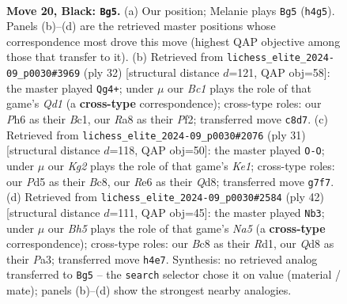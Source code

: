 \documentclass[11pt]{article}
\begin{document}
\clearpage

\begin{figure}[p]\centering
\begin{subfigure}{0.46\textwidth}\centering
\resizebox{\linewidth}{!}{%
\newchessgame
\chessboard[
  setfen={rnbq4/pp4kp/4r2p/1P1p4/3P2Pb/2N1PP2/2QKN3/R4B1R b - - 0 20},
  showmover=false,
  pgfstyle=straightmove, color=movearrow, markmove={h4-g5}
]}
\caption{}
\end{subfigure}\hfill
\begin{subfigure}{0.46\textwidth}\centering
\resizebox{\linewidth}{!}{%
\newchessgame
\chessboard[
  setfen={r3r3/2pknppp/1pn3b1/1R1p4/3P4/P1P4P/2P2PP1/2BQR1K1 w - - 1 17},
  showmover=false,
  pgfstyle=straightmove, color=movearrow, markmove={d1-g4}
]}
\caption{}
\end{subfigure}
\\[4pt]
\begin{subfigure}{0.46\textwidth}\centering
\resizebox{\linewidth}{!}{%
\newchessgame
\chessboard[
  setfen={r1bqk2r/p4pb1/7p/3Pn1p1/2N5/2P3P1/P4PP1/RN1QKB1R b KQkq - 0 16},
  showmover=false,
  pgfstyle=straightmove, color=movearrow, markmove={e8-g8}
]}
\caption{}
\end{subfigure}\hfill
\begin{subfigure}{0.46\textwidth}\centering
\resizebox{\linewidth}{!}{%
\newchessgame
\chessboard[
  setfen={4kb1r/2qn1pp1/p2p1n2/Np2pP2/4P3/P1PQB1RP/2P5/1K1R4 w k - 1 22},
  showmover=false,
  pgfstyle=straightmove, color=movearrow, markmove={a5-b3}
]}
\caption{}
\end{subfigure}
\caption{\textbf{Move 20, Black: \texttt{Bg5}.} (a) Our position; Melanie plays \texttt{Bg5} (\texttt{h4g5}). Panels (b)--(d) are the retrieved master positions whose correspondence most drove this move (highest QAP objective among those that transfer to it). (b) Retrieved from \texttt{lichess\_elite\_2024-09\_p0030\#3969} (ply 32) [structural distance $d$=121, QAP obj=58]: the master played \texttt{Qg4+}; under $\mu$ our \emph{Bc1} plays the role of that game's \emph{Qd1} (a \textbf{cross-type} correspondence); cross-type roles: our \emph{P}h6 as their \emph{B}c1, our \emph{R}a8 as their \emph{P}f2; transferred move \texttt{c8d7}. (c) Retrieved from \texttt{lichess\_elite\_2024-09\_p0030\#2076} (ply 31) [structural distance $d$=118, QAP obj=50]: the master played \texttt{O-O}; under $\mu$ our \emph{Kg2} plays the role of that game's \emph{Ke1}; cross-type roles: our \emph{P}d5 as their \emph{B}c8, our \emph{R}e6 as their \emph{Q}d8; transferred move \texttt{g7f7}. (d) Retrieved from \texttt{lichess\_elite\_2024-09\_p0030\#2584} (ply 42) [structural distance $d$=111, QAP obj=45]: the master played \texttt{Nb3}; under $\mu$ our \emph{Bh5} plays the role of that game's \emph{Na5} (a \textbf{cross-type} correspondence); cross-type roles: our \emph{B}c8 as their \emph{R}d1, our \emph{Q}d8 as their \emph{P}a3; transferred move \texttt{h4e7}. Synthesis: no retrieved analog transferred to \texttt{Bg5} -- the \texttt{search} selector chose it on value (material / mate); panels (b)--(d) show the strongest nearby analogies.}
\label{fig:thought-m39}
\end{figure}
\end{document}
